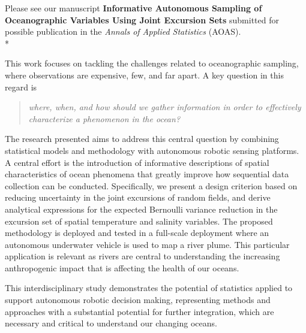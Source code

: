 \documentclass[10pt,stdletter]{newlfm}
\begin{document}
\begin{newlfm}

Please see our manuscript \textbf{Informative Autonomous Sampling of Oceanographic Variables Using Joint Excursion Sets} submitted for possible publication in the \emph{Annals of Applied Statistics} (AOAS).\\*

This work focuses on tackling the challenges related to oceanographic sampling, where observations are expensive, few, and far apart. A key question in this regard is 

\begin{quote}
\textit{where, when, and how should we gather information in order to effectively characterize a phenomenon in the ocean?}  
\end{quote}{}

The research presented aims to address this central question by combining statistical models and methodology with autonomous robotic sensing platforms. A central effort is the introduction of informative descriptions of spatial characteristics of ocean phenomena that greatly improve how sequential data collection can be conducted. Specifically, we present a design criterion based on reducing uncertainty in the joint excursions of random fields, and derive analytical expressions for the expected Bernoulli variance reduction in the excursion set of spatial temperature and salinity variables. The proposed methodology is deployed and tested in a full-scale deployment where an autonomous underwater vehicle is used to map a river plume. This particular application is relevant as rivers are central to understanding the increasing anthropogenic impact that is affecting the health of our oceans. 

This interdisciplinary study demonstrates the potential of statistics applied to support autonomous robotic decision making, representing methods and approaches with a substantial potential for further integration, which are necessary and critical to understand our changing oceans. 
\vspace{1em}


\end{newlfm}
\end{document}

